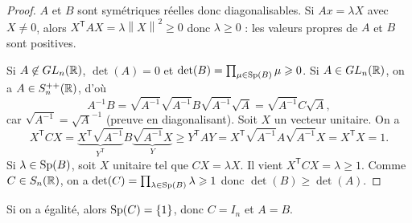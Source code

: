 \documentclass[12pt]{article}
\begin{document}
\begin{proof}
	$A$ et $B$ sont symétriques réelles donc diagonalisables. Si $Ax=\lambda X$ avec $X\neq0$, alors $X^{\mathsf{T}}AX=\lambda\left\lVert X\right\rVert^{2}\geqslant0$ donc $\lambda\geqslant0$ : les valeurs propres de $A$ et $B$ sont positives.

	Si $A\not\in GL_{n}(\mathbb{R})$, $\det(A)=0$ et $\det(B)=\prod_{\mu\in\operatorname{Sp}(B)}\mu\geqslant0$. Si $A\in GL_{n}(\mathbb{R})$, on a $A\in S_n^{++}(\mathbb{R})$, d'où 
	\begin{equation}
		A^{-1}B=\sqrt{A^{-1}}\sqrt{A^{-1}}B\sqrt{A^{-1}}\sqrt{A}=\sqrt{A^{-1}}C\sqrt{A},
	\end{equation}
	car $\sqrt{A^{-1}}=\sqrt{A}^{-1}$ (preuve en diagonalisant). Soit $X$ un vecteur unitaire. On a 
	\begin{equation}
		X^{\mathsf{T}}CX=\underbrace{X^{\mathsf{T}}\sqrt{A^{-1}}}_{Y^{\mathsf{T}}}B\underbrace{\sqrt{A^{-1}}X}_{Y}\geqslant Y^{\mathsf{T}}AY=X^{\mathsf{T}}\sqrt{A^{-1}}A\sqrt{A^{-1}}X=X^{\mathsf{T}}X=1.
	\end{equation}
	Si $\lambda\in\operatorname{Sp}(B)$, soit $X$ unitaire tel que $CX=\lambda X$. Il vient $X^{\mathsf{T}}CX=\lambda\geqslant1$.
	Comme $C\in S_n(\mathbb{R})$, on a $\det(C)=\prod_{\lambda\in\operatorname{Sp}(B)}\lambda\geqslant1$ donc $\det(B)\geqslant\det(A)$.
\end{proof}

\begin{remark}
	Si on a égalité, alors $\operatorname{Sp}(C)=\left\lbrace1\right\rbrace$, donc $C=I_n$ et $A=B$.
\end{remark}
\end{document}
